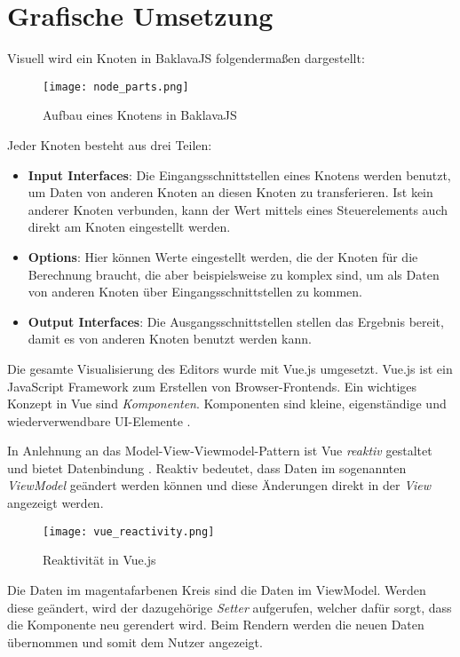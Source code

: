 \section{Grafische Umsetzung}
\label{sec:baklava:ui}

Visuell wird ein Knoten in BaklavaJS folgendermaßen dargestellt:

\begin{figure}[H]
    \centering
    \texttt{[image: node\_parts.png]}
    \caption{Aufbau eines Knotens in BaklavaJS}
    \label{fig:nodeparts}
\end{figure}

Jeder Knoten besteht aus drei Teilen:
\begin{itemize}
    \item \textbf{Input Interfaces}: Die Eingangsschnittstellen eines Knotens werden benutzt, um Daten von anderen Knoten an diesen Knoten zu transferieren. Ist kein anderer Knoten verbunden, kann der Wert mittels eines Steuerelements auch direkt am Knoten eingestellt werden.
    \item \textbf{Options}: Hier können Werte eingestellt werden, die der Knoten für die Berechnung braucht, die aber beispielsweise zu komplex sind, um als Daten von anderen Knoten über Eingangsschnittstellen zu kommen.
    \item \textbf{Output Interfaces}: Die Ausgangsschnittstellen stellen das Ergebnis bereit, damit es von anderen Knoten benutzt werden kann.
\end{itemize}

Die gesamte Visualisierung des Editors wurde mit Vue.js umgesetzt. Vue.js ist ein JavaScript Framework zum Erstellen von Browser-Frontends. Ein wichtiges Konzept in Vue sind \textit{Komponenten}. Komponenten sind kleine, eigenständige und wiederverwendbare UI-Elemente \cite{vue:components}.

In Anlehnung an das Model-View-Viewmodel-Pattern ist Vue \textit{reaktiv} gestaltet und bietet Datenbindung \cite{vue:instance}. Reaktiv bedeutet, dass Daten im sogenannten \textit{ViewModel} geändert werden können und diese Änderungen direkt in der \textit{View} angezeigt werden.

\begin{figure}[H]
    \centering
    \texttt{[image: vue\_reactivity.png]}
    \caption{Reaktivität in Vue.js \cite{vue:reactivity}}
    \label{fig:vuereactivity}
\end{figure}

Die Daten im magentafarbenen Kreis sind die Daten im ViewModel. Werden diese geändert, wird der dazugehörige \textit{Setter} aufgerufen, welcher dafür sorgt, dass die Komponente neu gerendert wird. Beim Rendern werden die neuen Daten übernommen und somit dem Nutzer angezeigt.

